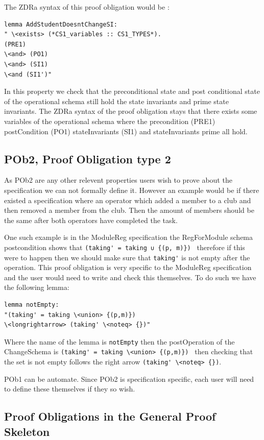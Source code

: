 The ZDRa syntax of this proof obligation would be :

\begin{verbatim}
lemma AddStudentDoesntChangeSI:
" \<exists> (*CS1_variables :: CS1_TYPES*).
(PRE1)
\<and> (PO1)
\<and> (SI1)
\<and (SI1')"
\end{verbatim}

In this property we check that the preconditional state and post conditional state of the operational schema still hold the state invariants and prime state invariants. The ZDRa syntax of the proof obligation stays that there exists some variables of the operational schema where the precondition (PRE1) postCondition (PO1) stateInvariants (SI1) and stateInvariants prime all hold.

\subsection{POb2, Proof Obligation type 2}

As POb2 are any other relevent properties users wish to prove about the specification we can not formally define it. However an example would be if there existed a specification where an operator which added a member to a club and then removed a member from the club. Then the amount of members should be the same after both operators have completed the task.

One such example is in the ModuleReg specification the RegForModule schema postcondition shows that \verb|(taking' = taking ∪ {(p, m)}) | therefore if this were to happen then we should make sure that \verb|taking'| is not empty after the operation. This proof obligation is very specific to the ModuleReg specification and the user would need to write and check this themselves. To do such we have the following lemma:

\begin{verbatim}
lemma notEmpty:
"(taking' = taking \<union> {(p,m)}) 
\<longrightarrow> (taking' \<noteq> {})"
\end{verbatim}

Where the name of the lemma is \verb|notEmpty| then the postOperation of the ChangeSchema is \verb|(taking' = taking \<union> {(p,m)}) | then checking that the set is not empty follows the right arrow \verb|(taking' \<noteq> {})|.

POb1 can be automate. Since POb2 is specification specific, each user will need to define these themselves if they so wish.

\subsection{Proof Obligations in the General Proof Skeleton}

